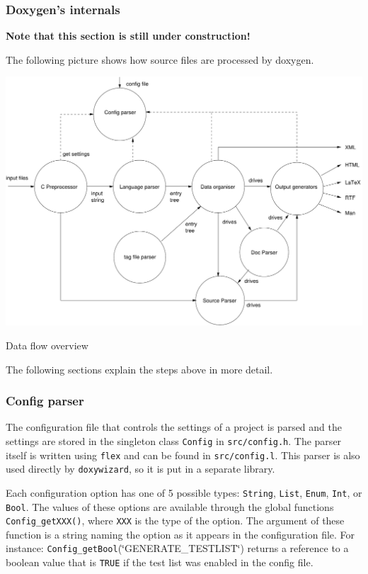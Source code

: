 \subsubsection*{Doxygen's internals}

{\bf Note that this section is still under construction!}

The following picture shows how source files are processed by doxygen.

\begin{Image}
\begin{center}
\includegraphics[width=14cm]{archoverview}\caption{Data flow overview}
\end{center}
\end{Image}


The following sections explain the steps above in more detail.

\subsubsection*{Config parser}

The configuration file that controls the settings of a project is parsed and the settings are stored in the singleton class {\tt Config} in {\tt src/config.h}. The parser itself is written using {\tt flex} and can be found in {\tt src/config.l}. This parser is also used directly by {\tt doxywizard}, so it is put in a separate library.

Each configuration option has one of 5 possible types: {\tt String}, {\tt List}, {\tt Enum}, {\tt Int}, or {\tt Bool}. The values of these options are available through the global functions {\tt Config\_\-getXXX()}, where {\tt XXX} is the type of the option. The argument of these function is a string naming the option as it appears in the configuration file. For instance: {\tt Config\_\-getBool}(\char`\"{}GENERATE\_\-TESTLIST\char`\"{}) returns a reference to a boolean value that is {\tt TRUE} if the test list was enabled in the config file.

